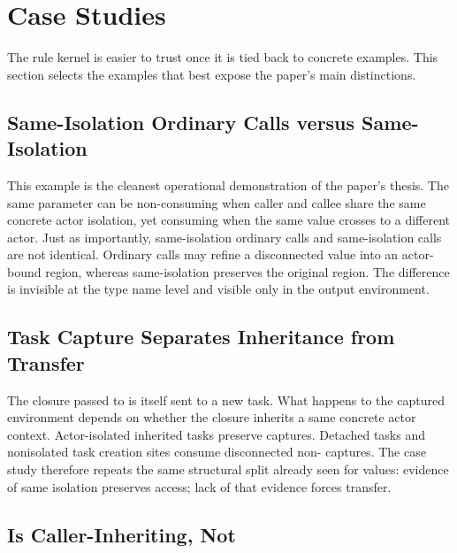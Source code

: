 \section{Case Studies}
\label{sec:case-studies}

The rule kernel is easier to trust once it is tied back to concrete examples. This section selects the examples that best expose the paper's main distinctions.

\subsection{Same-Isolation Ordinary Calls versus Same-Isolation }


This example is the cleanest operational demonstration of the paper's thesis. The same  parameter can be non-consuming when caller and callee share the same concrete actor isolation, yet consuming when the same value crosses to a different actor. Just as importantly, same-isolation ordinary calls and same-isolation  calls are not identical. Ordinary calls may refine a disconnected value into an actor-bound region, whereas same-isolation  preserves the original region. The difference is invisible at the type name level and visible only in the output environment.

\subsection{Task Capture Separates Inheritance from Transfer}


The closure passed to  is itself sent to a new task. What happens to the captured environment depends on whether the closure inherits a same concrete actor context. Actor-isolated inherited tasks preserve captures. Detached tasks and nonisolated task creation sites consume disconnected non- captures. The case study therefore repeats the same structural split already seen for values: evidence of same isolation preserves access; lack of that evidence forces transfer.

\subsection{ Is Caller-Inheriting, Not }

